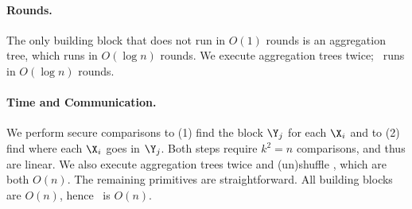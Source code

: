 

\paragraph{Rounds.} The only building block that does not run in $O(1)$ rounds is an aggregation tree, which runs in $O(\log n)$ rounds. We execute aggregation trees twice; \sqrtmergeprotocol\ runs in $O(\log n)$ rounds.

\paragraph{Time and Communication.} We perform secure comparisons to (1) find the block $\Y_j$ for each $\X_i$ and to (2) find where each $\X_i$ goes in $\Y_j$. Both steps require $k^2=n$ comparisons, and thus are linear. We also execute aggregation trees twice and (un)shuffle \cite{EPRINT:PRRS23}, which are both $O(n)$. The remaining primitives are straightforward. All building blocks are $O(n)$, hence \sqrtmergeprotocol\ is $O(n)$.